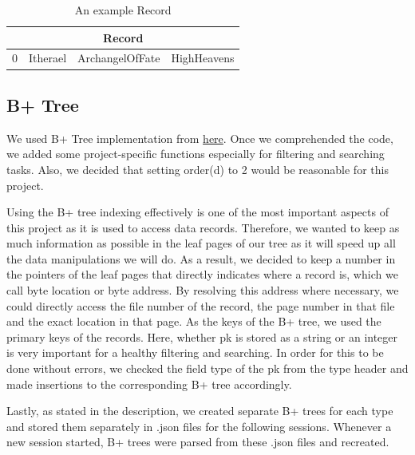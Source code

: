 \documentclass{article}
\begin{document}
\begin{table}[H]
\begin{center}
\begin{tabular}{|c|l|l|l|}
    \hline
    \multicolumn{4}{|c|}{\textbf{Record}}\\
    \hline
    0 & Itherael \hspace{1.4cm} &  ArchangelOfFate \hspace{0.5cm} & HighHeavens \hspace{1cm} \\
    \hline
\end{tabular}
\end{center}
\label{tab:multicol}
\caption{An example Record}
\end{table}


\subsection{B+ Tree}
\label{bplustree}
We used B+ Tree implementation from 
\href{https://github.com/benben233/Python-Bplus-tree/blob/master/bplustree.py}{here}. Once we comprehended the code, we added some project-specific functions especially for filtering and searching tasks. Also, we decided that setting order(d) to 2 would be reasonable for this project. 

Using the B+ tree indexing effectively is one of the most important aspects of this project as it is used to access data records. Therefore, we wanted to keep as much information as possible in the leaf pages of our tree as it will speed up all the data manipulations we will do. As a result, we decided to keep a number in the pointers of the leaf pages that directly indicates where a record is, which we call byte location or byte address. By resolving this address where necessary, we could directly access the file number of the record, the page number in that file and the exact location in that page. As the keys of the B+ tree, we used the primary keys of the records. Here, whether pk is stored as a string or an integer is very important for a healthy filtering and searching. In order for this to be done without errors, we checked the field type of the pk from the type header and made insertions to the corresponding B+ tree accordingly.

Lastly, as stated in the description, we created separate B+ trees for each type and stored them separately in .json files for the following sessions. Whenever a new session started, B+ trees were parsed from these .json files and recreated.
\end{document}
